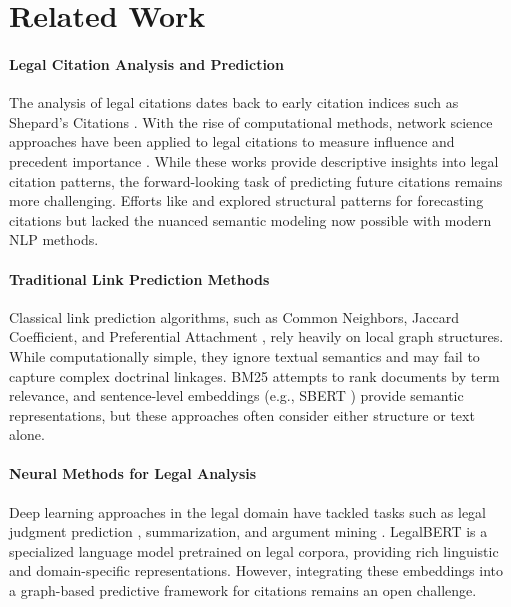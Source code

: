 \documentclass{article}
\begin{document}
\section{Related Work}
\paragraph{Legal Citation Analysis and Prediction}
The analysis of legal citations dates back to early citation indices such as Shepard's Citations \citep{mersky_fundamentals_2002}. With the rise of computational methods, network science approaches have been applied to legal citations to measure influence and precedent importance \citep{fowler2007network,bommarito2010network}. While these works provide descriptive insights into legal citation patterns, the forward-looking task of predicting future citations remains more challenging. Efforts like \citet{knight2002network} and \citet{post2000fractal} explored structural patterns for forecasting citations but lacked the nuanced semantic modeling now possible with modern NLP methods.

\paragraph{Traditional Link Prediction Methods}
Classical link prediction algorithms, such as Common Neighbors, Jaccard Coefficient, and Preferential Attachment \citep{liben2007link}, rely heavily on local graph structures. While computationally simple, they ignore textual semantics and may fail to capture complex doctrinal linkages. BM25 \citep{robertson2009probabilistic} attempts to rank documents by term relevance, and sentence-level embeddings (e.g., SBERT \citep{reimers2019sentence}) provide semantic representations, but these approaches often consider either structure or text alone.

\paragraph{Neural Methods for Legal Analysis}
Deep learning approaches in the legal domain have tackled tasks such as legal judgment prediction \citep{aletras_predicting_2016}, summarization, and argument mining \citep{zhong-etal-2018-legal}. LegalBERT \citep{chalkidis-etal-2020-legalbert} is a specialized language model pretrained on legal corpora, providing rich linguistic and domain-specific representations. However, integrating these embeddings into a graph-based predictive framework for citations remains an open challenge.
\end{document}

